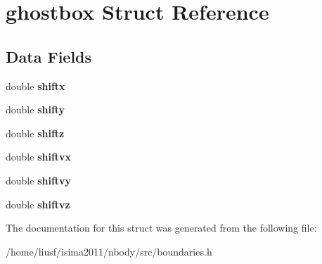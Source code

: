 \hypertarget{structghostbox}{
\section{ghostbox Struct Reference}
\label{structghostbox}
}
\subsection*{Data Fields}
\begin{DoxyCompactItemize}
\item 
\hypertarget{structghostbox_af35f9b3b33db3c41a012db9450c338ac}{
double {\bfseries shiftx}}
\label{structghostbox_af35f9b3b33db3c41a012db9450c338ac}

\item 
\hypertarget{structghostbox_aff98f662d8fa59199057d1b8bd7498e6}{
double {\bfseries shifty}}
\label{structghostbox_aff98f662d8fa59199057d1b8bd7498e6}

\item 
\hypertarget{structghostbox_a76aa8931e72b73dc9f08a46672cc89e8}{
double {\bfseries shiftz}}
\label{structghostbox_a76aa8931e72b73dc9f08a46672cc89e8}

\item 
\hypertarget{structghostbox_a916d3593a45e0ded559b42406fb6aedd}{
double {\bfseries shiftvx}}
\label{structghostbox_a916d3593a45e0ded559b42406fb6aedd}

\item 
\hypertarget{structghostbox_a398505d5dca95ba8f015674d5a354e09}{
double {\bfseries shiftvy}}
\label{structghostbox_a398505d5dca95ba8f015674d5a354e09}

\item 
\hypertarget{structghostbox_a6b486209fa86fea84cc5e22d8e418456}{
double {\bfseries shiftvz}}
\label{structghostbox_a6b486209fa86fea84cc5e22d8e418456}

\end{DoxyCompactItemize}


The documentation for this struct was generated from the following file:\begin{DoxyCompactItemize}
\item 
/home/liusf/isima2011/nbody/src/boundaries.h\end{DoxyCompactItemize}
